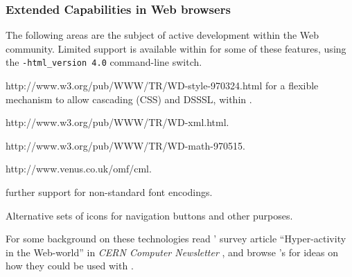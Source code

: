 \subsubsection*{Extended Capabilities in Web browsers}
The following areas are the subject of active development
within the Web community. 
Limited support is available within \latextohtml{} for some of these features,
using the \texttt{-html\_version 4.0} command-line switch.
\begin{description}
%
%
%
\item [style-sheets: ] %
{http://www.w3.org/pub/WWW/TR/WD-style-970324.html}
for a flexible mechanism to allow cascading (CSS) and DSSSL, 
within .
%
%
%
\item [XML: ] %
{http://www.w3.org/pub/WWW/TR/WD-xml.html}.

%
%
\item [MathML: ] %
{http://www.w3.org/pub/WWW/TR/WD-math-970515}.

%
%
\item [CML: ] %
{http://www.venus.co.uk/omf/cml}.

%
\item [Fonts: ] further support for non-standard font encodings.

%
\item [Icons: ] Alternative sets of icons for navigation buttons 
and other purposes.
\end{description}
For some background on these technologies read
\Goossens' survey article ``Hyper-activity in the Web-world''
in \textsl{CERN Computer Newsletter} 
,
and browse \AxelRamge's 
for ideas on how they could be used with \latextohtml.



\endinput















